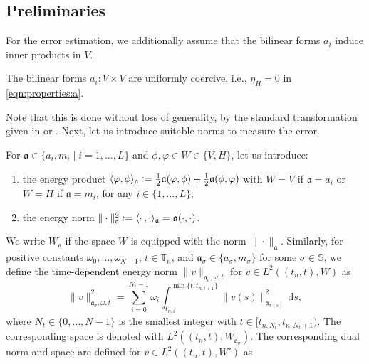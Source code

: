 \documentclass[reqno]{amsart}
\newcommand{\timeInt}{\mathbb{T}}
\newcommand{\ds}{\,\mathrm{d}s}
\newcommand{\coerAH}{\eta_H}
\newcommand{\switch}{\sigma}
\newcommand{\nrModes}{L}
\newcommand{\addSwitching}{\mathbb{S}}
\newcommand{\nrSwitches}{N}
\begin{document}
%
\subsection{Preliminaries}\label{subsec:preliminaries:error_est}
%
For the error estimation, we additionally assume that the bilinear forms $a_i$ induce inner products in $V$.
%
\begin{assumption}
    \label{ass:switchedSystem:A:coerciv}
    The bilinear forms $a_i\colon V\times V$ are uniformly coercive, i.e., $\coerAH = 0$ in \eqref{eqn:properties:a}.
\end{assumption}
%
Note that this is done without loss of generality, by the standard transformation given in \cite[Cha.~III, Sec.~1.2]{lions1971optimal} or \cite[Sec.~2.3]{DieG23}.
Next, let us introduce suitable norms to measure the error.
%
\begin{definition}\label{def:energy:norm}
   For $\mathfrak{a}\in\{a_i,m_i \mid i = 1, \ldots, \nrModes\}$ and $\phi,\varphi\in W\in\{ V,H\}$, let us introduce:
   \begin{enumerate}
       \item the energy product $\langle\varphi,\phi\rangle_{\mathfrak{a}}\vcentcolon= \tfrac{1}{2}\mathfrak{a}(\varphi,\phi)+\tfrac{1}{2}\mathfrak{a}(\phi,\varphi)$ with $W=V$ if $\mathfrak{a} = a_i$ or $W=H$ if $\mathfrak{a}= m_i$, for any $i\in \{1,\ldots,\nrModes\}$;
       \item the energy norm $\|\cdot\|^2_{\mathfrak{a}}\vcentcolon= \langle\cdot\,,\cdot\rangle_{\mathfrak{a}}=\mathfrak{a}(\cdot,\cdot)$.
   \end{enumerate}
   We write $W_{\mathfrak{a}}$ if the space $W$ is  equipped with the norm $\|\cdot\|_{\mathfrak{a}}$. Similarly, for positive constants $\omega_0,\ldots,\omega_{\nrSwitches-1}$, $t\in\timeInt_n$, and $\mathfrak{a}_{\switch}\in\{a_{\switch},m_{\switch}\}$ for some $\switch \in \addSwitching$, we define the time-dependent energy norm $\|v\|_{\mathfrak{a}_{\switch}, \omega,t}$
    for $v\in L^2((t_n,t), W)$ as
    \begin{equation}\nonumber
        \|v\|_{\mathfrak{a}_{\switch}, \omega,t}^2 = 
        \sum\limits_{i=0}^{N_t-1}\omega_i\int_{t_{n,i}}^{\min\{t,t_{n,i+1}\}}\|v(s)\|_{\mathfrak{a}_{\switch(s)}}^2 \ds,
    \end{equation}
    where $N_t\in\{0,\ldots,N-1\}$ is the smallest integer with $t\in [t_{n,N_{t}},t_{n,{N_t}+1})$. The corresponding space is denoted with $L^2((t_n,t), W_{\mathfrak{a}_{\switch}})$. The corresponding dual norm and space are defined for $v\in L^2((t_n,t), W')$ as

\end{definition}
\end{document}
